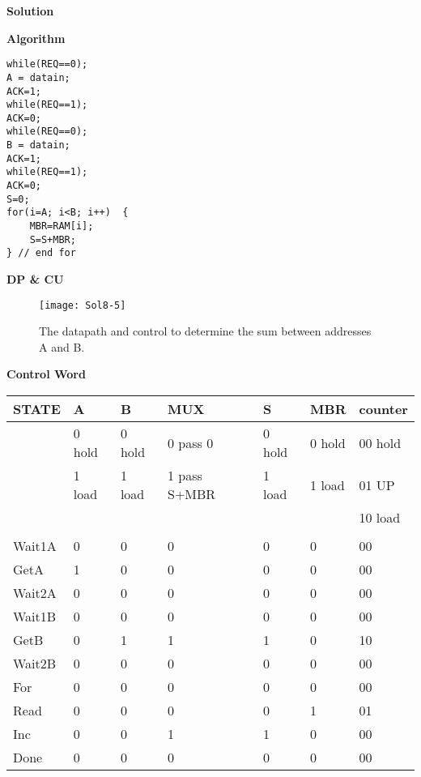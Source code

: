 \begin{enumerate}
        \begin{onlysolution}[fragile]  \textbf{Solution}

            \textbf{ Algorithm}
              \begin{verbatim}
while(REQ==0);
A = datain;
ACK=1;
while(REQ==1);
ACK=0;
while(REQ==0);
B = datain;
ACK=1;
while(REQ==1);
ACK=0;
S=0;
for(i=A; i<B; i++)  {
    MBR=RAM[i];
    S=S+MBR;
} // end for
\end{verbatim}

            \textbf{ DP \& CU}

            \begin{figure}[ht]
                \texttt{[image: Sol8-5]}
                \caption{The datapath and control to determine the sum between
                addresses A and B.}
            \end{figure}

            \textbf{ Control Word}

            \begin{tabular}{l|l|l|l|l|l|l}
                STATE  & A      & B      & MUX          & S      & MBR    & counter \\ \hline
                & 0 hold & 0 hold & 0 pass 0     & 0 hold & 0 hold & 00 hold \\ \hline
                & 1 load & 1 load & 1 pass S+MBR & 1 load & 1 load & 01 UP   \\ \hline
                &        &        &              &        &        & 10 load \\ \hline
                &        &        &              &        &        &         \\ \hline
                Wait1A & 0      & 0      & 0            & 0      & 0      & 00      \\ \hline
                GetA   & 1      & 0      & 0            & 0      & 0      & 00      \\ \hline
                Wait2A & 0      & 0      & 0            & 0      & 0      & 00      \\ \hline
                Wait1B & 0      & 0      & 0            & 0      & 0      & 00      \\ \hline
                GetB   & 0      & 1      & 1            & 1      & 0      & 10      \\ \hline
                Wait2B & 0      & 0      & 0            & 0      & 0      & 00      \\ \hline
                For    & 0      & 0      & 0            & 0      & 0      & 00      \\ \hline
                Read   & 0      & 0      & 0            & 0      & 1      & 01      \\ \hline
                Inc    & 0      & 0      & 1            & 1      & 0      & 00      \\ \hline
                Done   & 0      & 0      & 0            & 0      & 0      & 00      \\
            \end{tabular}


\end{onlysolution}
\end{enumerate}

